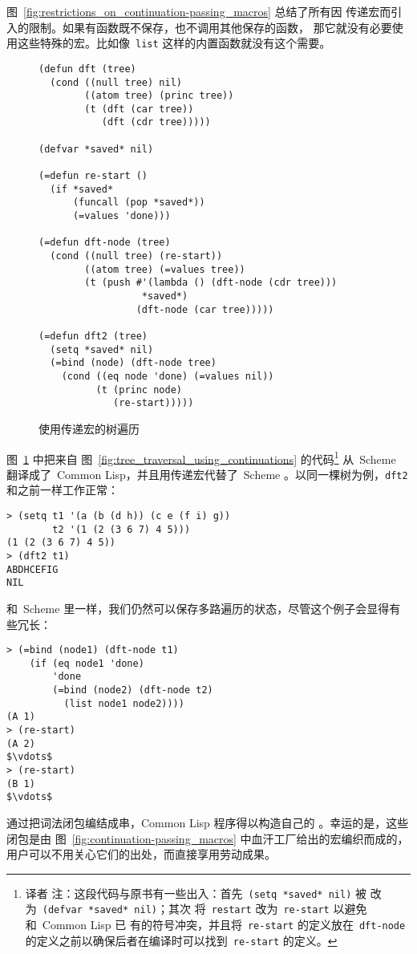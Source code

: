 图~\ref{fig:restrictions_on_continuation-passing_macros} 总结了所有因
\continuation{}传递宏而引入的限制。如果有函数既不保存\continuation{}，也不调用其他保存\continuation{}的函数，
那它就没有必要使用这些特殊的宏。比如像~\texttt{list} 这样的内置函数就没有这个需要。

\begin{figure}
\begin{lstlisting}
(defun dft (tree)
  (cond ((null tree) nil)
        ((atom tree) (princ tree))
        (t (dft (car tree))
           (dft (cdr tree)))))

(defvar *saved* nil)

(=defun re-start ()
  (if *saved*
      (funcall (pop *saved*))
      (=values 'done)))

(=defun dft-node (tree)
  (cond ((null tree) (re-start))
        ((atom tree) (=values tree))
        (t (push #'(lambda () (dft-node (cdr tree)))
                  *saved*)
                 (dft-node (car tree)))))

(=defun dft2 (tree)
  (setq *saved* nil)
  (=bind (node) (dft-node tree)
    (cond ((eq node 'done) (=values nil))
          (t (princ node)
             (re-start)))))
\end{lstlisting}
  \caption{使用\continuation{}传递宏的树遍历}
  \label{fig:tree_traversal_using_continuation-passing_macros}
\end{figure}

图~\ref{fig:tree_traversal_using_continuation-passing_macros} 中把来自
图~\ref{fig:tree_traversal_using_continuations} 的代码\footnote{译者
  注：这段代码与原书有一些出入：首先~\texttt{(setq *saved* nil)} 被
  改为~\texttt{(defvar *saved* nil)}；其次
  将~\texttt{restart} 改为~\texttt{re-start} 以避免和~Common Lisp 已
  有的符号冲突，并且将~\texttt{re-start} 的定义放在~\texttt{dft-node}
  的定义之前以确保后者在编译时可以找到~\texttt{re-start} 的定义。}
从~Scheme 翻译成了~Common Lisp，并且用\continuation{}传递宏代替了~Scheme
\continuation{}。以同一棵树为例，\texttt{dft2} 和之前一样工作正常：
\begin{lstlisting}
> (setq t1 '(a (b (d h)) (c e (f i) g))
        t2 '(1 (2 (3 6 7) 4 5)))
(1 (2 (3 6 7) 4 5))
> (dft2 t1)
ABDHCEFIG
NIL
\end{lstlisting}

和~Scheme 里一样，我们仍然可以保存多路遍历的状态，尽管这个例子会显得有些冗长：
\begin{lstlisting}
> (=bind (node1) (dft-node t1)
    (if (eq node1 'done)
        'done
        (=bind (node2) (dft-node t2)
          (list node1 node2))))
(A 1)
> (re-start)
(A 2)
$\vdots$
> (re-start)
(B 1)
$\vdots$
\end{lstlisting}
通过把词法闭包编结成串，Common Lisp 程序得以构造自己的
\continuation{}。幸运的是，这些闭包是由
图~\ref{fig:continuation-passing_macros} 中血汗工厂给出的宏编织而成的，
用户可以不用关心它们的出处，而直接享用劳动成果。

